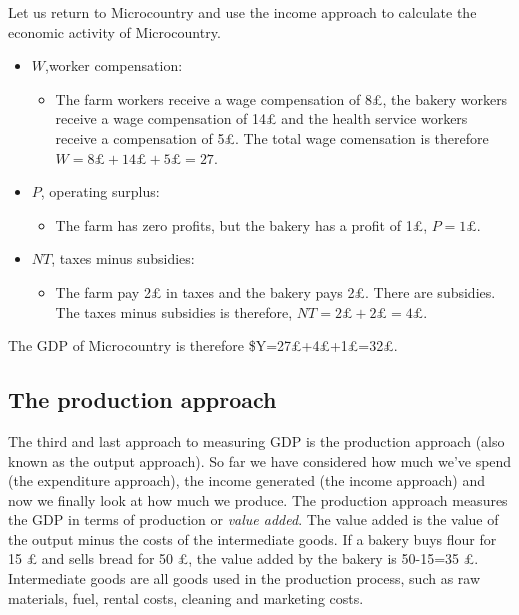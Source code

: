\documentclass[]{book}
\providecommand{\tightlist}{%
  \setlength{\itemsep}{0pt}\setlength{\parskip}{0pt}}
\begin{document}
Let us return to Microcountry and use the income approach to calculate the economic activity of Microcountry.

\begin{itemize}
\item
  \(W\),worker compensation:

  \begin{itemize}
  \tightlist
  \item
    The farm workers receive a wage compensation of 8£, the bakery workers receive a wage compensation of 14£ and the health service workers receive a compensation of 5£. The total wage comensation is therefore \(W=8£+14£+5£=27\).
  \end{itemize}
\item
  \(P\), operating surplus:

  \begin{itemize}
  \tightlist
  \item
    The farm has zero profits, but the bakery has a profit of 1£, \(P=1£\).
  \end{itemize}
\item
  \(NT\), taxes minus subsidies:

  \begin{itemize}
  \tightlist
  \item
    The farm pay 2£ in taxes and the bakery pays 2£. There are subsidies. The taxes minus subsidies is therefore, \(NT=2£+2£=4£\).
  \end{itemize}
\end{itemize}

The GDP of Microcountry is therefore \$Y=27£+4£+1£=32£.

\hypertarget{the-production-approach}{%
\subsection{The production approach}\label{the-production-approach}}

The third and last approach to measuring GDP is the production approach (also known as the output approach). So far we have considered how much we've spend (the expenditure approach), the income generated (the income approach) and now we finally look at how much we produce. The production approach measures the GDP in terms of production or \emph{value added}. The value added is the value of the output minus the costs of the intermediate goods. If a bakery buys flour for 15 £ and sells bread for 50 £, the value added by the bakery is 50-15=35 £. Intermediate goods are all goods used in the production process, such as raw materials, fuel, rental costs, cleaning and marketing costs.
\end{document}
